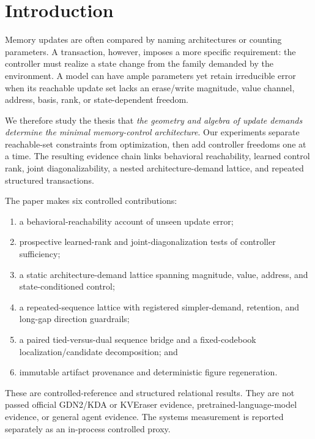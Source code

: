\section{Introduction}
\label{sec:introduction}

Memory updates are often compared by naming architectures or counting
parameters.  A transaction, however, imposes a more specific requirement: the
controller must realize a state change from the family demanded by the
environment.  A model can have ample parameters yet retain irreducible error
when its reachable update set lacks an erase/write magnitude, value channel,
address, basis, rank, or state-dependent freedom.

We therefore study the thesis that \emph{the geometry and algebra of update
demands determine the minimal memory-control architecture}.  Our experiments
separate reachable-set constraints from optimization, then add controller
freedoms one at a time.  The resulting evidence chain links behavioral
reachability, learned control rank, joint diagonalizability, a nested
architecture-demand lattice, and repeated structured transactions.

The paper makes six controlled contributions:
\begin{enumerate}
  \item a behavioral-reachability account of unseen update error;
  \item prospective learned-rank and joint-diagonalization tests of controller
        sufficiency;
  \item a static architecture-demand lattice spanning magnitude, value,
        address, and state-conditioned control;
  \item a repeated-sequence lattice with registered simpler-demand, retention,
        and long-gap direction guardrails;
  \item a paired tied-versus-dual sequence bridge and a fixed-codebook
        localization/candidate decomposition; and
  \item immutable artifact provenance and deterministic figure regeneration.
\end{enumerate}

These are controlled-reference and structured relational results.  They are
not passed official GDN2/KDA or KVEraser evidence, pretrained-language-model
evidence, or general agent evidence.  The systems measurement is reported
separately as an in-process controlled proxy.
